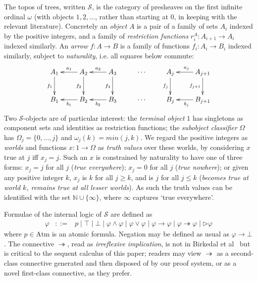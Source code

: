 \documentclass[envcountsect,envcountsame]{llncs}
\newcommand{\atms}{\mathrm{Atm}}
\newcommand{\iimp}{\twoheadrightarrow}
\newcommand{\limp}{\rightarrow}
\newcommand{\nxt}{\rhd}
\newcommand{\res}[2]{r^{#1}_{#2}}
\newcommand{\trees}{\mathcal{S}}
\begin{document}
The topos of trees, written $\trees$, is the category of presheaves on the first infinite
ordinal $\omega$ (with objects $1,2,\ldots$, rather than starting at $0$, in keeping with
the relevant literature).
Concretely an \emph{object} $A$ is a pair of a family of sets $A_i$
indexed by the positive integers, and a family of \emph{restriction functions}
$\res{A}{i}:A_{i+1}\to A_i$ indexed similarly. An \emph{arrow} $f:A\to B$ is a family
of functions $f_i:A_i\to B_i$ indexed similarly, subject to \emph{naturality}, i.e. all
squares below commute:
\[\xymatrix{
  A_1 \ar[d]_{f_1} & A_2  \ar[l]_{a_1} \ar[d]_{f_2} & A_3  \ar[l]_{a_2}  \ar[d]_{f_3} & \cdots & A_j  \ar[d]_{f_j} & A_{j+1}  \ar[l]_{a_j} \ar[d]_{f_{j+1}} \\
  B_1 & B_2 \ar[l]^{b_1} & B_3 \ar[l]^{b_2} & \cdots & B_j & B_{j+1} \ar[l]^{b_j}
}\]
Two $\trees$-objects are of particular interest: the \emph{terminal object} $1$ has 
singletons as component sets and identities as restriction functions;
the \emph{subobject classifier} $\Omega$ has $\Omega_j=\{0,\ldots,j\}$ and
$\omega_j(k)=min(j,k)$. We regard the positive integers as \emph{worlds} and
functions $x:1\to\Omega$ as \emph{truth values} over these worlds, by
considering $x$ true at $j$ iff $x_j=j$. Such an $x$ is constrained by naturality to have
one of three forms: $x_j=j$ for all $j$ (\emph{true everywhere}); $x_j=0$ for all $j$ (\emph{true nowhere}); or given any positive integer $k$, $x_j$ is $k$ for all $j\geq k$,
and is $j$ for all $j\leq k$ (\emph{becomes true at world $k$, remains true at all lesser
worlds}). As such the truth values can be identified with the set $\mathbb{N}\cup
\{\infty\}$, where $\infty$ captures `true everywhere'.

Formulae of the internal logic of $\trees$ are defined as
\begin{eqnarray*}
  \varphi & ::= &
      p \mid
     \top \mid
     \bot \mid
      \varphi\land\varphi \mid
     \varphi\lor\varphi \mid
     \varphi\limp\varphi \mid
     \varphi\iimp\varphi \mid
     \nxt\varphi
\end{eqnarray*}
where $p\in\atms$ is an atomic formula.
Negation may be defined as usual as $\varphi\limp\bot$.
The connective $\iimp$, read as \emph{irreflexive implication}, is not in Birkedal et
al~\cite{Birkedal:First} but is critical to the sequent calculus of this paper; readers may
view $\iimp$ as a second-class connective generated and then disposed of
by our proof system, or as a novel first-class connective, as they prefer.
\end{document}
